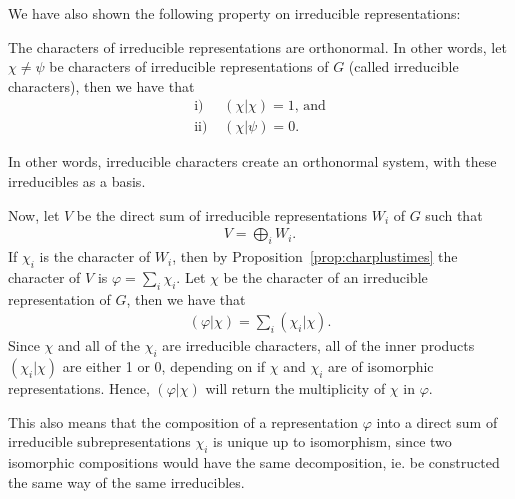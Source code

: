 
We have also shown the following property on irreducible representations:

\begin{theorem}\label{thm:irredcrit}
	The characters of irreducible representations are orthonormal. In other words, let $\chi \neq \psi$ be characters of irreducible representations of $G$ (called irreducible characters), then we have that 
	\begin{align*}
		\text{i) }& (\chi|\chi)= 1 \text{, and}  \\
		\text{ii) }& (\chi|\psi) = 0.
	\end{align*}  
\end{theorem}

In other words, irreducible characters create an orthonormal system, with these irreducibles as a basis.

Now, let $V$ be the direct sum of irreducible representations $W_i$ of $G$ such that
\begin{align*}
	V = \bigoplus_i W_i.
\end{align*}
If $\chi_i$ is the character of $W_i$, then by Proposition~\ref{prop:charplustimes} the character of $V$ is $\varphi = \sum_i \chi_i$.
Let $\chi$ be the character of an irreducible representation of $G$, then we have that
\begin{align*}
	(\varphi|\chi) = \sum_i (\chi_i|\chi).
\end{align*}
Since $\chi$ and all of the $\chi_i$ are irreducible characters, all of the inner products $(\chi_i|\chi)$ are either 1 or 0, depending on if $\chi$ and $\chi_i$ are of isomorphic representations. Hence, $(\varphi|\chi)$ will return the multiplicity of $\chi$ in $\varphi$. 

\begin{remark}
	This also means that the composition of a representation $\varphi$ into a direct sum of irreducible subrepresentations $\chi_i$ is unique up to isomorphism, since two isomorphic compositions would have the same decomposition, ie. be constructed the same way of the same irreducibles.
\end{remark}

